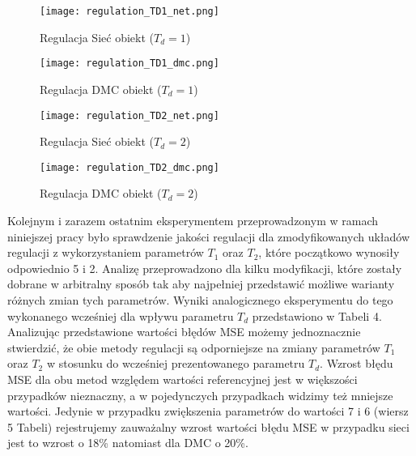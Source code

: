 \begin{figure}[!htb]
\centering
\begin{minipage}{.5\textwidth}
  \label{fig:Regulation-TD1-net}
  \centering \texttt{[image: regulation\_TD1\_net.png]}
  \caption{Regulacja Sieć obiekt (\(T_d=1\))}
  \label{fig:test1}
\end{minipage}%
\begin{minipage}{.5\textwidth}
  \label{fig:Regulation-TD1-dmc}
  \centering \texttt{[image: regulation\_TD1\_dmc.png]}
  \caption{Regulacja DMC obiekt (\(T_d=1\))}
\end{minipage}
\end{figure}

\begin{figure}[!htb]
\centering
\begin{minipage}{.5\textwidth}
  \label{fig:Regulation-TD2-net}
  \centering \texttt{[image: regulation\_TD2\_net.png]}
  \caption{Regulacja Sieć obiekt (\(T_d=2\))}
  \label{fig:test1}
\end{minipage}%
\begin{minipage}{.5\textwidth}
  \label{fig:Regulation-TD2-dmc}
  \centering \texttt{[image: regulation\_TD2\_dmc.png]}
  \caption{Regulacja DMC obiekt (\(T_d=2\))}
\end{minipage}
\end{figure}

\par Kolejnym i zarazem ostatnim eksperymentem przeprowadzonym w ramach niniejszej pracy było sprawdzenie jakości regulacji dla zmodyfikowanych układów regulacji z wykorzystaniem parametrów \(T_1\) oraz \(T_2\), które początkowo wynosiły odpowiednio 5 i 2. Analizę przeprowadzono dla kilku modyfikacji, które zostały dobrane w arbitralny sposób tak aby najpełniej przedstawić możliwe warianty różnych zmian tych parametrów. Wyniki analogicznego eksperymentu do tego wykonanego wcześniej dla wpływu parametru \(T_d\) przedstawiono w Tabeli 4. Analizując przedstawione wartości błędów MSE możemy jednoznacznie stwierdzić, że obie metody regulacji są odporniejsze na zmiany parametrów \(T_1\) oraz \(T_2\) w stosunku do wcześniej prezentowanego parametru \(T_d\). Wzrost błędu MSE dla obu metod względem wartości referencyjnej jest w większości przypadków nieznaczny, a w pojedynczych przypadkach widzimy też mniejsze wartości. Jedynie w przypadku zwiększenia parametrów do wartości 7 i 6 (wiersz 5 Tabeli) rejestrujemy zauważalny wzrost wartości błędu MSE w przypadku sieci jest to wzrost o 18\% natomiast dla DMC o 20\%.     

